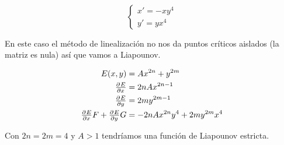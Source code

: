 \begin{example} \[\begin{cases} x' = -xy^4 \\ y'=yx^4 \end{cases} \]

En este caso el método de linealización no nos da puntos críticos aislados (la matriz es nula) así que vamos a Liapounov.

\begin{align*}
E(x,y) &= Ax^{2n} + y^{2m} \\
\pd{E}{x} &= 2n Ax^{2n-1} \\
\pd{E}{y} &= 2my^{2m-1} \\
\pd{E}{x}F + \pd{E}{y}G &= -2nAx^{2n}y^4 + 2my^{2m}x^4
\end{align*}

Con $2n=2m=4$ y $A>1$ tendríamos una función de Liapounov estricta.
\end{example}
